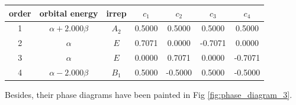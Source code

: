 \documentclass[a4paper]{book}
\newcommand\Figref[1]{Fig \ref{#1}}
\begin{document}
\begin{solution}
\begin{enumerate}[label=(\alph*)]
		\begin{center}
		\setlength{\abovecaptionskip}{-0.5em}
		\begin{tabular}{ccccccc}\hline
		order 	& orbital energy & irrep & $c_1$ & $c_2$ & $c_3$ &$c_4$ \\ \hline
			1	&	$\alpha+2.000\beta$	&	$A_2$	&	0.5000	&	0.5000	&	0.5000	&	0.5000	\\
			2	&	$\alpha$	&	$E$	&	0.7071	&	0.0000	&	-0.7071	&	0.0000	\\
			3	&	$\alpha$	&	$E$	&	0.0000	&	0.7071	&	0.0000	&	-0.7071	\\
			4	&	$\alpha-2.000\beta$	&	$B_1$	&	0.5000	&	-0.5000	&	0.5000	&	-0.5000	\\ \hline
		\end{tabular}
		\end{center}
		
		Besides, their phase diagrams have been painted in \Figref{fig:phase_diagram_3}.
		

\end{enumerate}
\end{solution}
\end{document}
